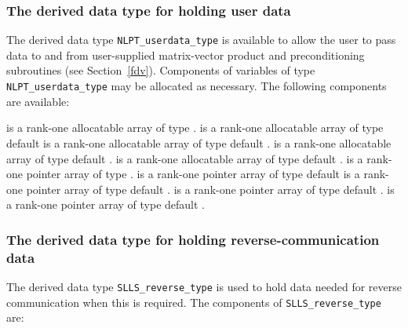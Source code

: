 \documentclass{galahad}
\newcommand{\packagename}{SLLS}
\begin{document}

\subsubsection{The derived data type for holding user data}\label{typeuserdata}
The derived data type
{\tt NLPT\_userdata\_type}
is available to allow the user to pass data to and from user-supplied
matrix-vector product and preconditioning
subroutines (see Section~\ref{fdv}).
Components of variables of type {\tt NLPT\_userdata\-\_type} may be allocated as
necessary. The following components are available:

\begin{description}
 is a rank-one allocatable array of type \integer.
 is a rank-one allocatable array of type default  \realdp
{} is a rank-one allocatable array of type default \complexdp.
 is a rank-one allocatable array of type default \character.
 is a rank-one allocatable array of type default \logical.
 is a rank-one pointer array of type \integer.
 is a rank-one pointer array of type default  \realdp
{} is a rank-one pointer array of type default \complexdp.
 is a rank-one pointer array of type default \character.
 is a rank-one pointer array of type default \logical.
\end{description}


\subsubsection{The derived data type for holding reverse-communication data}\label{typereverse}
The derived data type
{\tt \packagename\_reverse\_type}
is used to hold data needed for reverse communication when this is
required.
The components of
{\tt \packagename\_reverse\_type}
are:
\end{document}
